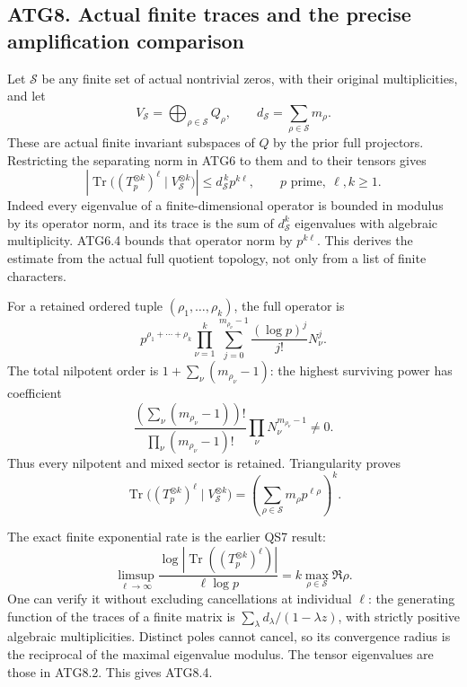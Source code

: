 \subsection{ATG8. Actual finite traces and the precise amplification
comparison}\label{atg8.-actual-finite-traces-and-the-precise-amplification-comparison}

Let \(\mathscr S\) be any finite set of actual nontrivial zeros, with
their original multiplicities, and let \[
V_{\mathscr S}=\bigoplus_{\rho\in\mathscr S}Q_\rho,\qquad
d_{\mathscr S}=\sum_{\rho\in\mathscr S}m_\rho.
\] These are actual finite invariant subspaces of \(Q\) by the prior
full projectors. Restricting the separating norm in ATG6 to them and to
their tensors gives \[
\left|\operatorname{Tr}\bigl((T_p^{\otimes k})^\ell
 \mid V_{\mathscr S}^{\otimes k}\bigr)\right|
 \le d_{\mathscr S}^{\,k}p^{k\ell},
\qquad p\text{ prime},\ \ell,k\ge1 .
\tag{ATG8.1}
\] Indeed every eigenvalue of a finite-dimensional operator is bounded
in modulus by its operator norm, and its trace is the sum of
\(d_{\mathscr S}^k\) eigenvalues with algebraic multiplicity. ATG6.4
bounds that operator norm by \(p^{k\ell}\). This derives the estimate
from the actual full quotient topology, not only from a list of finite
characters.

For a retained ordered tuple \((\rho_1,\ldots,\rho_k)\), the full
operator is \[
p^{\rho_1+\cdots+\rho_k}
 \prod_{\nu=1}^k\sum_{j=0}^{m_{\rho_\nu}-1}
 \frac{(\log p)^j}{j!}N_\nu^j.
\tag{ATG8.2}
\] The total nilpotent order is \(1+\sum_\nu(m_{\rho_\nu}-1)\): the
highest surviving power has coefficient \[
\frac{(\sum_\nu(m_{\rho_\nu}-1))!}
 {\prod_\nu(m_{\rho_\nu}-1)!}
 \prod_\nu N_\nu^{m_{\rho_\nu}-1}\ne0.
\] Thus every nilpotent and mixed sector is retained. Triangularity
proves \[
\operatorname{Tr}\bigl((T_p^{\otimes k})^\ell
 \mid V_{\mathscr S}^{\otimes k}\bigr)
 =\left(\sum_{\rho\in\mathscr S}m_\rho p^{\ell\rho}\right)^k.
\tag{ATG8.3}
\]

The exact finite exponential rate is the earlier QS7 result: \[
\limsup_{\ell\to\infty}
 \frac{\log|\operatorname{Tr}((T_p^{\otimes k})^\ell)|}{\ell\log p}
 =k\max_{\rho\in\mathscr S}\Re\rho.
\tag{ATG8.4}
\] One can verify it without excluding cancellations at individual
\(\ell\): the generating function of the traces of a finite matrix is
\(\sum_\lambda d_\lambda/(1-\lambda z)\), with strictly positive
algebraic multiplicities. Distinct poles cannot cancel, so its
convergence radius is the reciprocal of the maximal eigenvalue modulus.
The tensor eigenvalues are those in ATG8.2. This gives ATG8.4.

